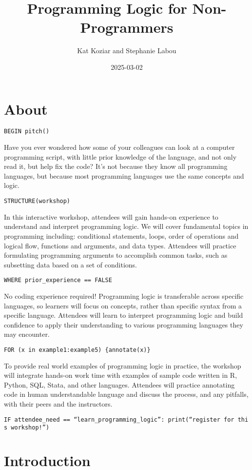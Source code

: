 \documentclass[
]{book}
\title{Programming Logic for Non-Programmers}
\author{Kat Koziar and Stephanie Labou}
\date{2025-03-02}
\begin{document}
\maketitle

{
\setcounter{tocdepth}{1}
\tableofcontents
}
\chapter{About}\label{about}

\texttt{BEGIN\ pitch()}

Have you ever wondered how some of your colleagues can look at a computer programming script, with little prior knowledge of the language, and not only read it, but help fix the code? It's not because they know all programming languages, but because most programming languages use the same concepts and logic.

\texttt{STRUCTURE(workshop)}

In this interactive workshop, attendees will gain hands-on experience to understand and interpret programming logic. We will cover fundamental topics in programming including: conditional statements, loops, order of operations and logical flow, functions and arguments, and data types. Attendees will practice formulating programming arguments to accomplish common tasks, such as subsetting data based on a set of conditions.

\texttt{WHERE\ prior\_experience\ ==\ FALSE}

No coding experience required! Programming logic is transferable across specific languages, so learners will focus on concepts, rather than specific syntax from a specific language. Attendees will learn to interpret programming logic and build confidence to apply their understanding to various programming languages they may encounter.

\texttt{FOR\ (x\ in\ example1:example5)\ \{annotate(x)\}}

To provide real world examples of programming logic in practice, the workshop will integrate hands-on work time with examples of sample code written in R, Python, SQL, Stata, and other languages. Attendees will practice annotating code in human understandable language and discuss the process, and any pitfalls, with their peers and the instructors.

\texttt{IF\ attendee\_need\ ==\ “learn\_programming\_logic”:\ print(“register\ for\ this\ workshop!”)}

\chapter{Introduction}\label{intro}
\end{document}
